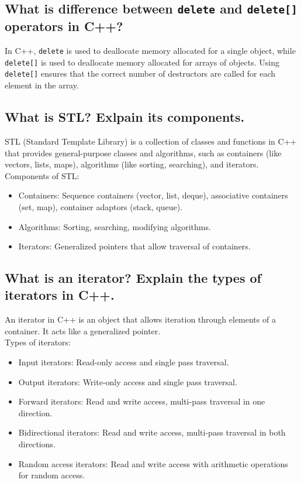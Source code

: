 \subsection{What is difference between \texttt{delete} and \texttt{delete[]} operators in C++?}
In C++, \texttt{delete} is used to deallocate memory allocated for a single object, while \texttt{delete[]} is used to deallocate memory allocated for arrays of objects. Using \texttt{delete[]} ensures that the correct number of destructors are called for each element in the array.

\subsection{What is STL? Exlpain its components.}
STL (Standard Template Library) is a collection of classes and functions in C++ that provides general-purpose classes and algorithms, such as containers (like vectors, lists, maps), algorithms (like sorting, searching), and iterators. \\
Components of STL:
\begin{itemize}
    \item Containers: Sequence containers (vector, list, deque), associative containers (set, map), container adaptors (stack, queue).
    \item Algorithms: Sorting, searching, modifying algorithms.
    \item Iterators: Generalized pointers that allow traversal of containers.
\end{itemize}

\subsection{What is an iterator? Explain the types of iterators in C++.}
An iterator in C++ is an object that allows iteration through elements of a container. It acts like a generalized pointer. \\
Types of iterators:
\begin{itemize}
    \item Input iterators: Read-only access and single pass traversal.
    \item Output iterators: Write-only access and single pass traversal.
    \item Forward iterators: Read and write access, multi-pass traversal in one direction.
    \item Bidirectional iterators: Read and write access, multi-pass traversal in both directions.
    \item Random access iterators: Read and write access with arithmetic operations for random access.
\end{itemize}

